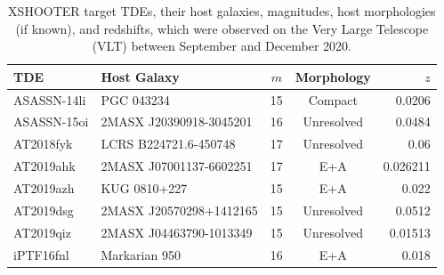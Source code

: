 \documentclass[a4paper,11pt]{article}
\begin{document}

\lipsum[1]

\begin{table}[H]
  \centering
  \begin{tabular}{l l c c r}
    TDE         & Host Galaxy             & $m$ & Morphology & $z$      \\
    \hline \hline
    ASASSN-14li & PGC 043234              & 15  & Compact    & 0.0206   \\
    ASASSN-15oi & 2MASX J20390918-3045201 & 16  & Unresolved & 0.0484   \\
    AT2018fyk   & LCRS B224721.6-450748   & 17  & Unresolved & 0.06     \\
    AT2019ahk   & 2MASX J07001137-6602251 & 17  & E+A        & 0.026211 \\
    AT2019azh   & KUG 0810+227            & 15  & E+A        & 0.022    \\
    AT2019dsg   & 2MASX J20570298+1412165 & 15  & Unresolved & 0.0512   \\
    AT2019qiz   & 2MASX J04463790-1013349 & 15  & Unresolved & 0.01513  \\
    iPTF16fnl   & Markarian 950           & 16  & E+A        & 0.018    \\
    \hline
  \end{tabular}
  \caption{XSHOOTER target TDEs, their host galaxies, magnitudes, host morphologies (if known), and redshifts, which were observed on the Very Large Telescope (VLT) between September and December 2020.\cite{Zwicky_1975, Jose_2014, Holoien_2016a, Arcavi_2015, Holoien_2016b, Wevers_2021, Cacella_2019, Holoien_2019, van_Velzen_2019, Perez_Torres_2019, Seibert_2019, Gezari_2016, Blagorodnova_2017}}
  \label{tab:xshooter_data}
\end{table}
\end{document}
